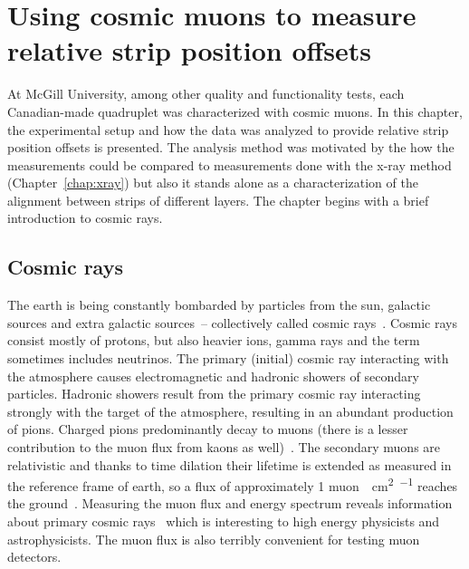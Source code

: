 
\chapter{Using cosmic muons to measure relative strip position offsets}
\label{chap:cosmics}

At McGill University, among other quality and functionality tests, each Canadian-made quadruplet was characterized with cosmic muons. In this chapter, the experimental setup and how the data was analyzed to provide relative strip position offsets is presented. The analysis method was motivated by the how the measurements could be compared to measurements done with the x-ray method (Chapter~\ref{chap:xray}) but also it stands alone as a characterization of the alignment between strips of different layers. The chapter begins with a brief introduction to cosmic rays.

\section{Cosmic rays}

The earth is being constantly bombarded by particles from the sun, galactic sources and extra galactic sources~-- collectively called cosmic rays~\cite{boezio_chemical_2012, zyla_review_2020}. Cosmic rays consist mostly of protons, but also heavier ions, gamma rays and the term sometimes includes neutrinos. The primary (initial) cosmic ray interacting with the atmosphere causes electromagnetic and hadronic showers of secondary particles. Hadronic showers result from the primary cosmic ray interacting strongly with the target of the atmosphere, resulting in an abundant production of pions. Charged pions predominantly decay to muons (there is a lesser contribution to the muon flux from kaons as well)~\cite{grieder_cosmic_2001}. The secondary muons are relativistic and thanks to time dilation their lifetime is extended as measured in the reference frame of earth, so a flux of approximately 1 muon\SI{}{\per\cm\squared\per\min} reaches the ground~\cite{zyla_review_2020}. Measuring the muon flux and energy spectrum reveals information about primary cosmic rays~\cite{grieder_cosmic_2001} which is interesting to high energy physicists and astrophysicists. The muon flux is also terribly convenient for testing muon detectors.

